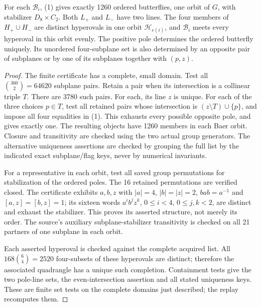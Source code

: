 \documentclass[11pt]{article}
\newcommand{\orb}{\mathcal B}\newcommand{\hyp}{\mathcal H}
\begin{document}
\begin{lemma}
For each $\orb_i$, (1) gives exactly 1260 ordered butterflies, one orbit of
$G$, with stabilizer $D_8\times C_2$. Both $L_+$ and $L_-$ have two lines.
The four members of $H_+\cup H_-$ are distinct hyperovals in one orbit
$\hyp_{e(i)}$, and $\orb_i$ meets every hyperoval in this orbit evenly.
The positive pole determines the ordered butterfly uniquely. Its unordered
four-subplane set is also determined by an opposite pair of subplanes or by
one of its subplanes together with $(p,z)$.
\end{lemma}
\begin{proof}
The finite certificate has a complete, small domain. Test all
$\binom{360}{2}=64620$ subplane pairs. Retain a pair when its intersection
is a collinear triple $T$. There are 3780 such pairs. For each, its line $z$
is unique. For each of the three choices $p\in T$, test all retained pairs
whose intersection is $(z\setminus T)\cup\{p\}$, and impose all four
equalities in (1). This exhausts every possible opposite pole, and gives
exactly one. The resulting objects have 1260 members in each Baer orbit.
Closure and transitivity are checked using the two actual group generators.
The alternative uniqueness assertions are checked by grouping the full list
by the indicated exact subplane/flag keys, never by numerical invariants.

For a representative in each orbit, test all saved group permutations for
stabilization of the ordered poles. The 16 retained permutations are verified
closed. The certificate exhibits $a,b,z$ with $|a|=4$, $|b|=|z|=2$,
$bab=a^{-1}$ and $[a,z]=[b,z]=1$; its sixteen words
$a^ib^jz^k$, $0\leq i<4$, $0\leq j,k<2$, are distinct and exhaust the
stabilizer. This proves its asserted structure, not merely its order.
The source's auxiliary subplane-stabilizer transitivity is checked on all
21 partners of one subplane in each orbit.

Each asserted hyperoval is checked against the complete acquired list.
All $168\binom 64=2520$ four-subsets of these hyperovals are distinct;
therefore the associated quadrangle has a unique such completion.
Containment tests give the two pole-line sets, the even-intersection
assertion and all stated uniqueness keys. These are finite set tests on the
complete domains just described; the replay recomputes them.
\end{proof}
\end{document}
